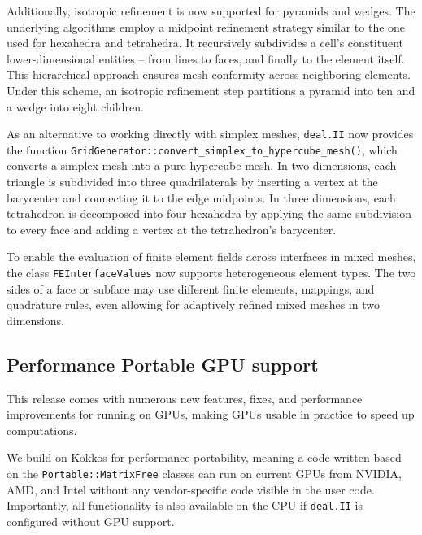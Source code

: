 \documentclass{ansarticle-preprint}
\newcommand{\specialword}[1]{\texttt{#1}}
\newcommand{\dealii}{{\specialword{deal.II}}\xspace}
\begin{document}
Additionally, isotropic refinement is now supported for pyramids and
wedges. The underlying algorithms employ a midpoint refinement
strategy similar to the one used for hexahedra and tetrahedra. It
recursively subdivides a cell's constituent lower-dimensional entities
-- from lines to faces, and finally to the element itself. This hierarchical approach ensures mesh conformity across neighboring elements. Under this scheme, an isotropic refinement step partitions a pyramid into ten and a wedge into eight children.

As an alternative to working directly with simplex meshes, \dealii now
provides the function
\texttt{GridGenerator::convert\_simplex\_to\_hypercube\_mesh()}, which
converts a simplex mesh into a pure hypercube mesh.
In two dimensions, each triangle is subdivided into three quadrilaterals by inserting a vertex at the barycenter and connecting it to the edge midpoints.
In three dimensions, each tetrahedron is decomposed into four hexahedra by applying the same subdivision to every face and adding a vertex at the tetrahedron's barycenter.

To enable the evaluation of finite element fields across interfaces in
mixed meshes, the class \texttt{FEInterfaceValues} now supports heterogeneous element types.
The two sides of a face or subface may use different finite elements, mappings, and quadrature rules, even allowing for adaptively refined mixed meshes in two dimensions.

\subsection{Performance Portable GPU support}
\label{subsec:gpu}

This release comes with numerous new features, fixes, and performance improvements for running on GPUs, making GPUs
usable in practice to speed up computations.

We build on Kokkos \cite{trott2022} for performance portability, meaning a
code written based on the \texttt{Portable::MatrixFree} classes can run on
current GPUs from NVIDIA, AMD, and Intel without any vendor-specific code
visible in the user code. Importantly, all functionality is also available
on the CPU if \dealii{} is configured without GPU support.
\end{document}
